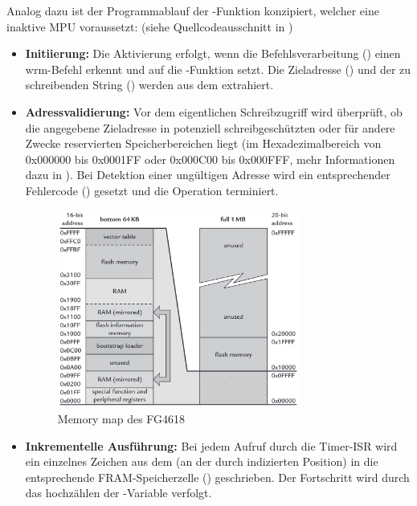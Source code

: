 \newpage
Analog dazu ist der Programmablauf der -Funktion konzipiert, welcher eine inaktive MPU voraussetzt: (siehe Quellcodeausschnitt in )
\begin{itemize}
	\item \textbf{Initiierung:} Die Aktivierung erfolgt, wenn die Befehlsverarbeitung () einen \glqq{}wrm\grqq{}-Befehl erkennt und  auf die -Funktion setzt. Die Zieladresse () und der zu schreibenden String () werden aus dem  extrahiert.
	
	\item \textbf{Adressvalidierung:} Vor dem eigentlichen Schreibzugriff wird \"uberpr\"uft, ob die angegebene Zieladresse in potenziell schreibgesch\"utzten oder f\"ur andere Zwecke reservierten Speicherbereichen liegt (\zB im Hexadezimalbereich von 0x000000 bis 0x0001FF oder 0x000C00 bis 0x000FFF, mehr Informationen dazu in ). Bei Detektion einer ung\"ultigen Adresse wird ein entsprechender Fehlercode () gesetzt und die Operation terminiert.
	
	\begin{figure}[h!]
		\centering
		\includegraphics[width=0.75\textwidth]{../Bilder/memory_map.png}
		\caption{Memory map des FG4618 }
		\label{fig:memory_map}
	\end{figure}
	
	\item \textbf{Inkrementelle Ausf\"uhrung:} Bei jedem Aufruf durch die Timer-ISR wird ein einzelnes Zeichen aus dem  (an der durch  indizierten Position) in die entsprechende FRAM-Speicherzelle () geschrieben. Der Fortschritt wird durch das hochz\"ahlen der -Variable verfolgt.
	

\end{itemize}
